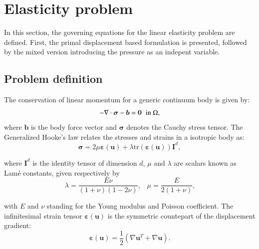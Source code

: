 \documentclass[english,11pt,3p,number,sort&compress]{elsarticle}
\begin{document}
\section{Elasticity problem \label{sec:Governing-equations}}

In this section, the governing equations for the linear elasticity problem are defined. First, the primal displacement based formulation is presented, followed by the mixed version introducing the pressure as an indepent variable.

\subsection{Problem definition}

The conservation of linear momentum for a generic continuum body is given by:
\begin{equation} \label{eq:momentum}
		-\nabla \cdot \bm{\sigma} - \bm{b} = \bm{0} \hspace{0.2cm} \text{in } \Omega ,
\end{equation}
\noindent where $\bm{b}$ is the body force vector and $\bm{\sigma}$ denotes the Cauchy stress tensor. The Generalized Hooke's law relates the stresses and strains in a isotropic body as:
\begin{equation} \label{eq:hook}
    \bm{\sigma} = 2\mu \bm{\varepsilon}(\bm{u}) + \lambda \text{tr}(\bm{\varepsilon}(\bm{u})) \bm{I}^d ,
\end{equation}

\noindent where $\mathbf{I}^d$ is the identity tensor of dimension $d$, $\mu$ and $\lambda$ are scalars known as Lam\'{e} constants, given respectively by
\begin{equation}
	\lambda = \frac{E\nu}{(1+\nu)(1-2\nu)} \text{,} \quad \mu = \frac{E}{2(1+\nu)} \text{,}
\end{equation}

\noindent with $E$ and $\nu$ standing for the Young modulus and Poisson coefficient. The infinitesimal strain tensor $\bm{\varepsilon}(\bm{u})$ is the symmetric countepart of the displacement gradient:
\begin{equation} \label{eq:strain}
    \bm{\varepsilon}(\bm{u})=\frac{1}{2}(\nabla\bm{u}^T+\nabla\bm{u}) \text{.}
\end{equation}
\end{document}
